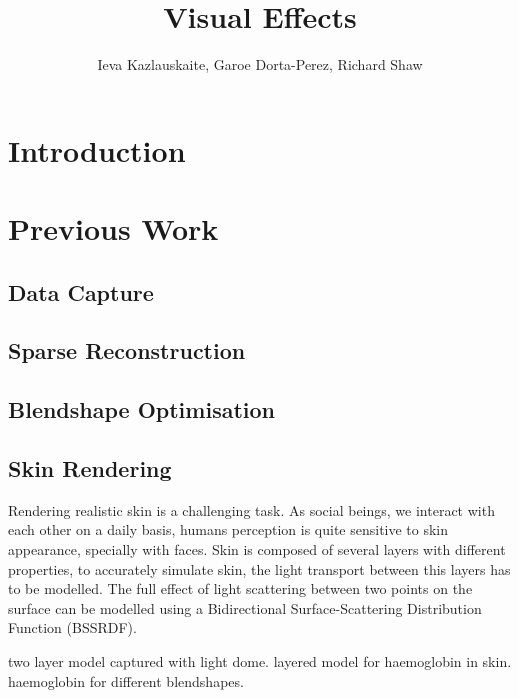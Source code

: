 \documentclass[11pt]{report}
\title{Visual Effects} \author{Ieva Kazlauskaite, Garoe Dorta-Perez, Richard Shaw}
\begin{document}
\maketitle

\chapter{Introduction}
\label{ch:intro}
\begin{center}
\end{center}


\chapter{Previous Work}
\label{sec:previous}

\section{Data Capture}


\section{Sparse Reconstruction}


\section{Blendshape Optimisation}


\section{Skin Rendering}

Rendering realistic skin is a challenging task.
As social beings, we interact with each other on a daily basis, humans perception is quite sensitive to skin appearance, specially with faces.
Skin is composed of several layers with different properties, to accurately simulate skin, the light transport between this layers has to be modelled.
The full effect of light scattering between two points on the surface can be modelled using a Bidirectional Surface-Scattering Distribution Function (BSSRDF).

\cite{Weyrich2006} two layer model captured with light dome. 
\cite{Donner2008} layered model for haemoglobin in skin.
\cite{Jimenez2010} haemoglobin for different blendshapes.
\end{document}
